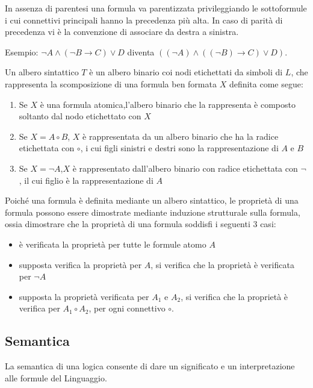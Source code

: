 \documentclass[a4paper,12pt, oneside]{book}
\begin{document}
In assenza di parentesi una formula va parentizzata privileggiando le
sottoformule 
i cui connettivi principali hanno la precedenza più alta.\newline
In caso di parità di precedenza vi è la convenzione di associare da destra a
sinistra. 

Esempio:\newline
$\neg A \land (\neg B \rightarrow C) \lor D$ diventa
$((\neg A) \land ((\neg B) \rightarrow C) \lor D)$.

\begin{definizione}
  Un albero sintattico $T$ è un albero binario coi nodi etichettati da simboli
  di $L$, che rappresenta la scomposizione di una formula ben formata $X$
  definita 
  come segue: 
\end{definizione}
\begin{enumerate}
  \item Se $X$ è una formula atomica,l'albero binario che la rappresenta è
  composto 
  soltanto dal nodo etichettato con $X$
  \item Se $X = A \circ B$, $X$ è rappresentata da un albero binario che ha la
  radice 
  etichettata con $\circ$, i cui figli sinistri e destri sono la
  rappresentazione di $A$ e $B$ 
  \item Se $X = \neg A$,$X$ è rappresentato dall'albero binario con radice
  etichettata 
  con $\neg$, il cui figlio è la rappresentazione di $A$
\end{enumerate}

Poiché una formula è definita mediante un albero sintattico, le proprietà di una
formula 
possono essere dimostrate mediante induzione strutturale sulla formula, ossia
dimostrare 
che la proprietà di una formula soddisfi i seguenti 3 casi:
\begin{itemize}
  \item è verificata la proprietà per tutte le formule atomo $A$
  \item supposta verifica la proprietà per $A$, si verifica che la proprietà è
  verificata per $\neg A$ 
  \item supposta la proprietà verificata per $A_1$ e $A_2$, si verifica che la
  proprietà è verifica per $A_1 \circ A_2$, per ogni connettivo $\circ$.
\end{itemize}
\newpage
\subsection{Semantica}
La semantica di una logica consente di dare un significato e un interpretazione
alle formule del Linguaggio.\newline
\end{document}
